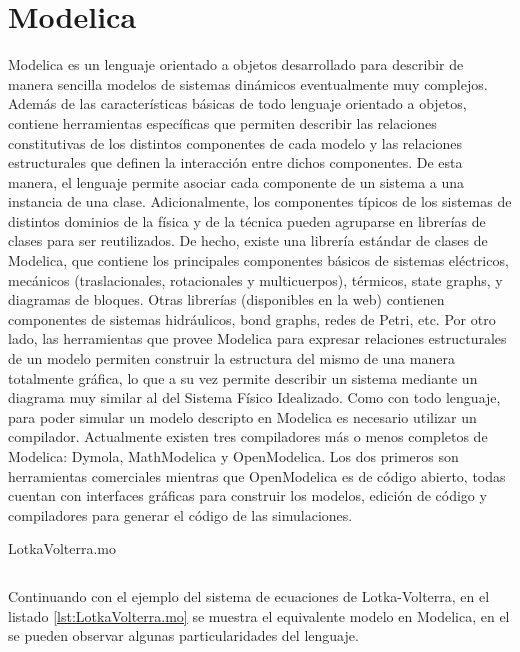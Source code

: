 \section{Modelica}

	Modelica\cite{Fri98}\cite{Fritzson02modelica} es un lenguaje orientado a objetos desarrollado para describir de manera sencilla modelos de sistemas 
	dinámicos eventualmente muy complejos.
	Además de las características básicas de todo lenguaje orientado a objetos, contiene herramientas específicas que permiten describir las relaciones
	constitutivas de los distintos componentes de cada modelo y las relaciones estructurales que definen la interacción entre dichos componentes.
	De esta manera, el lenguaje permite asociar cada componente de un sistema a una instancia de una clase.
	Adicionalmente, los componentes típicos de los sistemas de distintos dominios de la física y de la técnica pueden agruparse en librerías de clases para ser
	reutilizados. De hecho, existe una librería estándar de clases de Modelica, que contiene los principales componentes básicos de sistemas eléctricos,
	mecánicos (traslacionales, rotacionales y multicuerpos), térmicos, state graphs, y diagramas de bloques. 
	Otras librerías (disponibles en la web) contienen componentes de sistemas hidráulicos, bond graphs, redes de Petri, etc.
	Por otro lado, las herramientas que provee Modelica para expresar relaciones estructurales de un modelo permiten construir la estructura del mismo de una
	manera totalmente gráfica, lo que a su vez permite describir un sistema mediante un diagrama muy similar al del Sistema Físico Idealizado.
	Como con todo lenguaje, para poder simular un modelo descripto en Modelica es necesario utilizar un compilador. Actualmente existen tres compiladores
	más o menos completos de Modelica: Dymola, MathModelica y OpenModelica. Los dos primeros son herramientas comerciales mientras que OpenModelica es de código
	abierto, todas cuentan con interfaces gráficas para construir los modelos, edición de código y compiladores para generar el código de las simulaciones.

\begin{listing}[H]    
	\caption{LotkaVolterra.mo}
	\inputminted[linenos]{modelica}{src/LotkaVolterra.mo}
	\label{lst:LotkaVolterra.mo}
\end{listing}
	
	Continuando con el ejemplo del sistema de ecuaciones de Lotka-Volterra, en el listado \ref{lst:LotkaVolterra.mo} se muestra el equivalente modelo en Modelica, 
	en el se pueden observar algunas particularidades del lenguaje.
	
